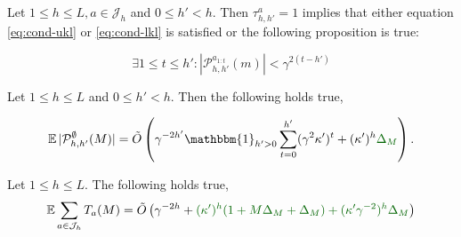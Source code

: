 \begin{lemma}
	\label{lemma:size_Ph}
	\begin{leftbar}[lemmabar]
	Let $1 \leq h \leq L,  a\in \mathcal{J}_h$ and $0\leq h'<h$. Then $\tau^a_{h,h'}=1$ implies that either equation \eqref{eq:cond-ukl} or \eqref{eq:cond-lkl} is satisfied or the following proposition is true:
	
	
	\begin{equation}
	\label{eq:P-min-size}
	\exists 1\leq t \leq h': |\mathcal{P}_{h,h'}^{a_{1:t}}(m)| < \gamma^{2(t-h')}
	\end{equation}
	\end{leftbar}
\end{lemma}

\begin{lemma}
	\label{lemma:expected-P-size}
    \begin{leftbar}[lemmabar]
	Let $1\leq h\leq L$ and $0 \leq h' < h$. Then the following holds true,
	
	\begin{equation*}
	\expectedvalue |\mathcal{P}^\emptyset_{h,h'}(M)| = \tilde{O}\left(\gamma^{-2h'}\mathbbm{1}_{h'>0}\sum_{t=0}^{h'}(\gamma^2 \kappa')^t + (\kappa')^h\diff{\Delta_M} \right).
	\end{equation*}
	\end{leftbar}
\end{lemma}

\begin{lemma}
	\label{lemma:expected-plays-count}
	\begin{leftbar}[lemmabar]
	Let $1\leq h\leq L$. The following holds true,
	\begin{equation*}
	\expectedvalue \sum_{a\in \mathcal{J}_h} T_a(M) = \tilde{O}\left(\gamma^{-2h} + \diff{(\kappa')^h(1+M\Delta_M+\Delta_M) + (\kappa'\gamma^{-2})^h\Delta_M}\right)
	\end{equation*}
	\end{leftbar}
\end{lemma}

